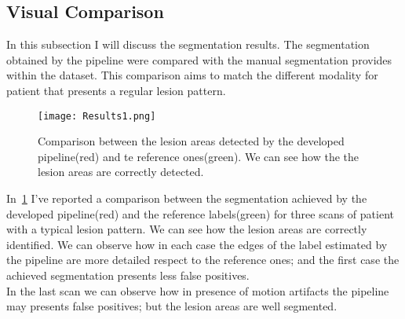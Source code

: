 \documentclass{standalone}
\begin{document}
	\subsection{Visual Comparison}
	
	In this subsection I will discuss the segmentation results. The segmentation obtained by the pipeline were compared with the manual segmentation provides within the dataset. This comparison aims to match the different modality for patient that presents a regular lesion pattern. 
	
	\begin{figure}[h!]
		\centering
			\texttt{[image: Results1.png]}
			\caption{Comparison between the lesion areas detected by the developed pipeline(red) and te reference ones(green). We can see how the the lesion areas are correctly detected. }\label{fig:Results}
	\end{figure}

	In \figurename\,\ref{fig:Results} I've reported a comparison between the segmentation achieved by the developed pipeline(red) and the reference labels(green) for three scans of patient with a typical lesion pattern. We can see how the lesion areas are correctly identified. We can observe how in each case the edges of the label estimated by the pipeline are more detailed respect to the reference ones; and the first case the achieved segmentation presents less false positives.\\ In the last scan we can observe how in presence of motion artifacts the pipeline may presents false positives; but the lesion areas are well segmented.
	
	
\end{document}
